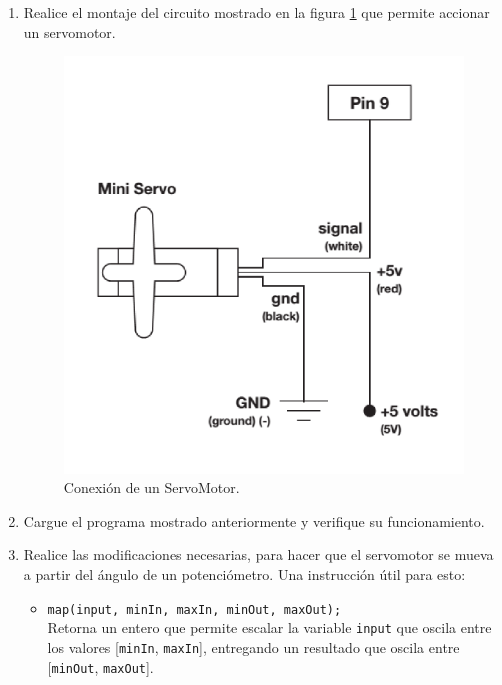 \documentclass[letterpaper, 10pt]{report}
\begin{document}
\begin{enumerate}
	\item Realice el montaje del circuito mostrado en la figura \ref{circuitServo} que permite accionar un servomotor.
	
\begin{figure}[h]
\centering
\includegraphics[scale=0.4]{servoCircuit.png}
\caption{Conexión de un ServoMotor.\label{circuitServo}}
\end{figure}

\item Cargue el programa mostrado anteriormente y verifique su funcionamiento.

\item Realice las modificaciones necesarias, para hacer que el servomotor se mueva a partir del ángulo de un potenciómetro. Una instrucción útil para esto:
	\begin{itemize}
		\item \texttt{map(input, minIn, maxIn, minOut, maxOut);}\\
		Retorna un entero que permite escalar la variable \texttt{input} que oscila entre los valores [\texttt{minIn}, {\tt maxIn}], entregando un resultado que oscila entre [{\tt minOut}, {\tt maxOut}]. 
	\end{itemize}	
\end{enumerate}
\end{document}

